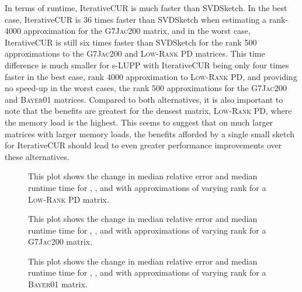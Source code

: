 In terms of runtime, IterativeCUR is much faster than SVDSketch. In the best case, IterativeCUR is 36 times faster than SVDSketch when estimating a rank-4000 approximation for the \textsc{G7Jac200} matrix, and in the worst case, IterativeCUR is still six times faster than SVDSketch for the rank 500 approximations to the \textsc{G7Jac200} and \textsc{Low-Rank PD} matrices.  This time difference is much smaller for s-LUPP with IterativeCUR being only four times faster in the best case, rank 4000 approximation to \textsc{Low-Rank PD}, and providing no speed-up in the worst cases, the rank 500 approximations for the \textsc{G7Jac200} and \textsc{Bayer01} matrices.  Compared to both alternatives, it is also important to note that the benefits are greatest for the densest matrix, \textsc{Low-Rank PD}, where the memory load is the highest. This seems to suggest that on much larger matrices with larger memory loads, the benefits afforded by a single small sketch for IterativeCUR should lead to even greater performance improvements over these alternatives.  

\begin{figure}[h]
    \centering
    
    \caption{This plot shows the change in median relative error and median runtime time for \svds, \icurl, and \curs with approximations of varying rank for a \textsc{Low-Rank PD} matrix.}
    \label{fig:fixed_rank_low_rank_pd}
\end{figure}
\begin{figure}[h]
    \centering
    
    \caption{This plot shows the change in median relative error and median runtime time for \svds, \icurl, and \curs{} with approximations of varying rank for a \textsc{G7Jac200} matrix.}
    \label{fig:fixed_rank_g7jac}
\end{figure}
\begin{figure}[h]
    \centering
    
    \caption{This plot shows the change in median relative error and median runtime time for \svds, \icurl, and \curs{} with approximations of varying rank for a \textsc{Bayer01} matrix.}
    \label{fig:fixed_rank_bayer01}
\end{figure}



